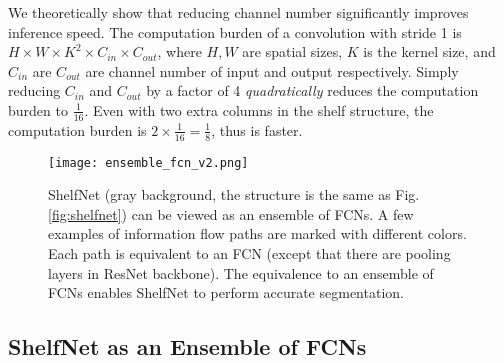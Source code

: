 \documentclass[10pt,twocolumn,letterpaper]{article}
\begin{document}
We theoretically show that reducing channel number significantly improves inference speed. The computation burden of a convolution with stride 1 is $H \times W \times K^2 \times C_{in} \times C_{out}$, where $H, W$ are spatial sizes, $K$ is the kernel size, and $C_{in}$ are $C_{out}$ are channel number of input and output respectively. Simply reducing $C_{in}$ and $C_{out}$ by a factor of 4 \textit{quadratically} reduces the computation burden to $\frac{1}{16}$. Even with two extra columns in the shelf structure, the computation burden is $2\times \frac{1}{16} = \frac{1}{8}$, thus is faster.

































\begin{figure}[!htb]
    \centering
    \texttt{[image: ensemble\_fcn\_v2.png]}
        \caption{\small{ShelfNet (gray background, the structure is the same as Fig. \ref{fig:shelfnet}) can be viewed as an ensemble of FCNs. A few examples of information flow paths are marked with different colors. Each path is equivalent to an FCN (except that there are pooling layers in ResNet backbone). The equivalence to an ensemble of FCNs enables ShelfNet to perform accurate segmentation.}
        }
    \label{ensemble}
\end{figure} 







\subsection{ShelfNet as an Ensemble of FCNs}
\label{sec:fcn_ensemble}
\end{document}
